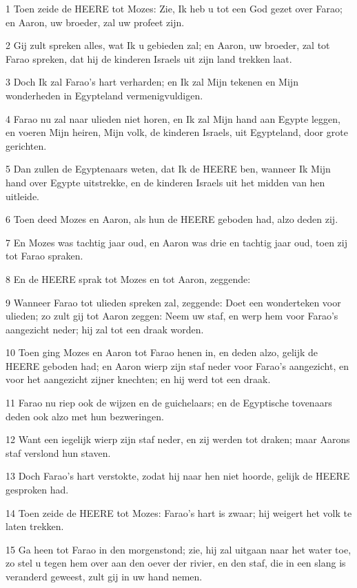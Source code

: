 \par 1 Toen zeide de HEERE tot Mozes: Zie, Ik heb u tot een God gezet over Farao; en Aaron, uw broeder, zal uw profeet zijn.
\par 2 Gij zult spreken alles, wat Ik u gebieden zal; en Aaron, uw broeder, zal tot Farao spreken, dat hij de kinderen Israels uit zijn land trekken laat.
\par 3 Doch Ik zal Farao's hart verharden; en Ik zal Mijn tekenen en Mijn wonderheden in Egypteland vermenigvuldigen.
\par 4 Farao nu zal naar ulieden niet horen, en Ik zal Mijn hand aan Egypte leggen, en voeren Mijn heiren, Mijn volk, de kinderen Israels, uit Egypteland, door grote gerichten.
\par 5 Dan zullen de Egyptenaars weten, dat Ik de HEERE ben, wanneer Ik Mijn hand over Egypte uitstrekke, en de kinderen Israels uit het midden van hen uitleide.
\par 6 Toen deed Mozes en Aaron, als hun de HEERE geboden had, alzo deden zij.
\par 7 En Mozes was tachtig jaar oud, en Aaron was drie en tachtig jaar oud, toen zij tot Farao spraken.
\par 8 En de HEERE sprak tot Mozes en tot Aaron, zeggende:
\par 9 Wanneer Farao tot ulieden spreken zal, zeggende: Doet een wonderteken voor ulieden; zo zult gij tot Aaron zeggen: Neem uw staf, en werp hem voor Farao's aangezicht neder; hij zal tot een draak worden.
\par 10 Toen ging Mozes en Aaron tot Farao henen in, en deden alzo, gelijk de HEERE geboden had; en Aaron wierp zijn staf neder voor Farao's aangezicht, en voor het aangezicht zijner knechten; en hij werd tot een draak.
\par 11 Farao nu riep ook de wijzen en de guichelaars; en de Egyptische tovenaars deden ook alzo met hun bezweringen.
\par 12 Want een iegelijk wierp zijn staf neder, en zij werden tot draken; maar Aarons staf verslond hun staven.
\par 13 Doch Farao's hart verstokte, zodat hij naar hen niet hoorde, gelijk de HEERE gesproken had.
\par 14 Toen zeide de HEERE tot Mozes: Farao's hart is zwaar; hij weigert het volk te laten trekken.
\par 15 Ga heen tot Farao in den morgenstond; zie, hij zal uitgaan naar het water toe, zo stel u tegen hem over aan den oever der rivier, en den staf, die in een slang is veranderd geweest, zult gij in uw hand nemen.
